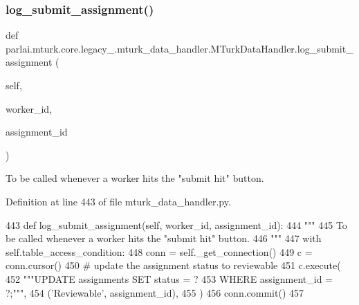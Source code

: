 \subsubsection{\texorpdfstring{log\+\_\+submit\+\_\+assignment()}{log\_submit\_assignment()}}
{\footnotesize\ttfamily def parlai.\+mturk.\+core.\+legacy\+\_.\+mturk\+\_\+data\+\_\+handler.\+M\+Turk\+Data\+Handler.\+log\+\_\+submit\+\_\+assignment (\begin{DoxyParamCaption}\item[{}]{self,  }\item[{}]{worker\+\_\+id,  }\item[{}]{assignment\+\_\+id }\end{DoxyParamCaption})}

\begin{DoxyVerb}To be called whenever a worker hits the "submit hit" button.
\end{DoxyVerb}
 

Definition at line 443 of file mturk\+\_\+data\+\_\+handler.\+py.


\begin{DoxyCode}
443     \textcolor{keyword}{def }log\_submit\_assignment(self, worker\_id, assignment\_id):
444         \textcolor{stringliteral}{"""}
445 \textcolor{stringliteral}{        To be called whenever a worker hits the "submit hit" button.}
446 \textcolor{stringliteral}{        """}
447         with self.table\_access\_condition:
448             conn = self.\_get\_connection()
449             c = conn.cursor()
450             \textcolor{comment}{# update the assignment status to reviewable}
451             c.execute(
452                 \textcolor{stringliteral}{"""UPDATE assignments SET status = ?}
453 \textcolor{stringliteral}{                         WHERE assignment\_id = ?;"""},
454                 (\textcolor{stringliteral}{'Reviewable'}, assignment\_id),
455             )
456             conn.commit()
457 
\end{DoxyCode}
\mbox{\label{classparlai_1_1mturk_1_1core_1_1legacy__2018_1_1mturk__data__handler_1_1MTurkDataHandler_ac38ddedd0a8efa4e833a502e8d2860c6}} 
